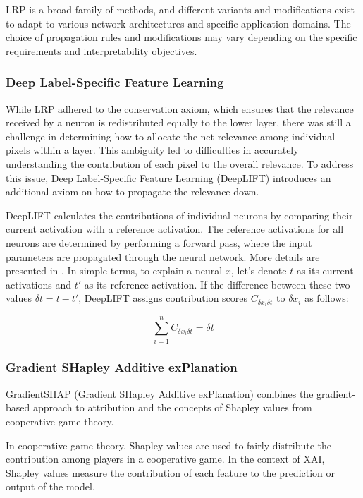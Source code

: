 LRP is a broad family of methods, and different variants and modifications exist to adapt to various network architectures and specific application domains. The choice of propagation rules and modifications may vary depending on the specific requirements and interpretability objectives.

\subsubsection{Deep Label-Specific Feature Learning}
\label{subsubsec:deeplift}
While LRP adhered to the conservation axiom, which ensures that the relevance received by a neuron is redistributed equally to the lower layer, there was still a challenge in determining how to allocate the net relevance among individual pixels within a layer. This ambiguity led to difficulties in accurately understanding the contribution of each pixel to the overall relevance. To address this issue, Deep Label-Specific Feature Learning (DeepLIFT) \cite{deeplift} introduces an additional axiom on how to propagate the relevance down. 

DeepLIFT calculates the contributions of individual neurons by comparing their current activation with a reference activation. The reference activations for all neurons are determined by performing a forward pass, where the input parameters are propagated through the neural network. More details are presented in \cite{deeplift}. In simple terms, to explain a neural $x$, let's denote $t$ as its current activations and $t'$ as its reference activation. If the difference between these two values $\delta t = t - t'$, DeepLIFT assigns contribution scores $C_{\delta x_i \delta t}$ to $\delta x_i$ as follows:

\begin{equation}
\label{equation:deeplift}
    \sum_{i = 1}^{n} C_{\delta x_i \delta t} = \delta t
\end{equation}

\subsubsection{Gradient SHapley Additive exPlanation}
\label{subsubsec:gradshap}

GradientSHAP (Gradient SHapley Additive exPlanation) \cite{shap} combines the gradient-based approach to attribution and  the concepts of Shapley values from cooperative game theory.

In cooperative game theory, Shapley values are used to fairly distribute the contribution among players in a cooperative game. In the context of XAI, Shapley values measure the contribution of each feature to the prediction or output of the model.

